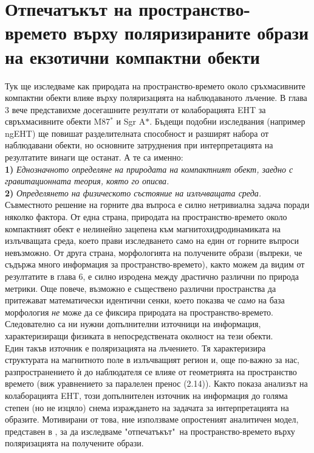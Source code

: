 \section{Отпечатъкът на пространство-времето върху поляризираните образи на екзотични компактни обекти}
Тук ще изследваме как природата на пространство-времето около сръхмасивните компактни обекти влияе върху поляризацията на наблюдаваното лъчение. В глава 3 вече представихме досегашните резултати от колаборацията EHT за свръхмасивните обекти M87$^*$ и Sgr A$*$. Бъдещи подобни изследвания (например ngEHT) ще повишат разделителната способност и разширят набора от наблюдавани обекти, но основните затруднения при интерпретацията на резултатите винаги ще останат. А те са именно:\\

\textbf{1)} \emph{Еднозначното определяне на природата на компактният обект, заедно с гравитационната теория, която го описва.}\\

\textbf{2)} \emph{Определянето на физическото състояние на излъчващата среда.}\\

Съвместното решение на горните два въпроса е силно нетривиална задача поради няколко фактора. От една страна, природата на пространство-времето около компактният обект е нелинейно зацепена към магнитохидродинамиката на излъчващата среда, което прави изследването само на един от горните въпроси невъзможно. От друга страна, морфологията на получените образи (въпреки, че съдържа много информация за пространство-времето), както можем да видим от резултатите в глава 6, е силно изродена между драстично различни по природа метрики. Още повече, възможно е съществено различни пространства да притежават математически идентични сенки\cite{PhysRevD.103.084040}, което показва че \emph{само} на база морфология \emph{не} може да се фиксира природата на пространство-времето. Следователно са ни нужни допълнителни източници на информация, характеризиращи физиката в непосредствената околност на тези обекти. \\

Един такъв източник е поляризацията на лъчението. Тя характеризира структурата на магнитното поле в излъчващият регион и, още по-важно за нас, разпространението ѝ до наблюдателя се влияе от геометрията на пространство времето (виж уравнението за паралелен пренос (2.14)). Както показа анализът на колаборацията EHT, този допълнителен източник на информация до голяма степен (но не изцяло) снема израждането на задачата за интерпретацията на образите. Мотивирани от това, ние използваме опростеният аналитичен модел, представен в \cite{Narayan2021}, за да изследваме "отпечатъкът"$\,$ на пространство-времето върху поляризацията на получените образи.\\

